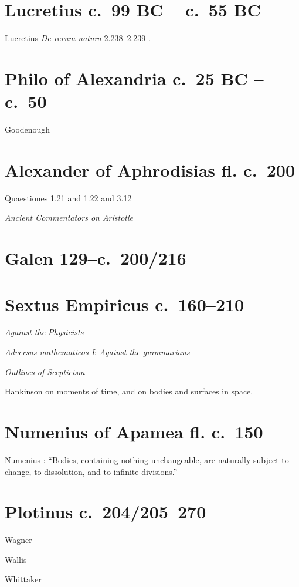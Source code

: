 \documentclass{amsart}
\theoremstyle{definition}
\begin{document}
\section{Lucretius c.~99 BC -- c.~55 BC}
Lucretius {\em De rerum natura} 2.238--2.239 \cite{melville}.

\section{Philo of Alexandria c.~25 BC -- c.~50}
Goodenough \cite[pp.~127--139]{goodenough}

\section{Alexander of Aphrodisias fl. c.~200}
Quaestiones 1.21 and 1.22 \cite[pp.~74--75]{quaestiones11} and 3.12 \cite[p.~67]{quaestiones216}

{\em Ancient Commentators on Aristotle}


\section{Galen 129--c.~200/216}

\section{Sextus Empiricus c.~160--210}
{\em Against the Physicists} \cite{bett}

{\em Adversus mathematicos I}: {\em Against the grammarians} \cite[pp.~8, 61, 166]{blank}

{\em Outlines of Scepticism} \cite{annas}

Hankinson \cite{sceptics} on moments of time, and on bodies and surfaces in space.

\section{Numenius of Apamea fl. c.~150}
Numenius \cite[p.~58]{numenius}: ``Bodies, containing nothing unchangeable, are naturally subject to change, to dissolution,
and to infinite divisions.''

\section{Plotinus c.~204/205--270}
Wagner \cite{wagner}

Wallis \cite{wallis}

Whittaker \cite{whittaker}
\end{document}
